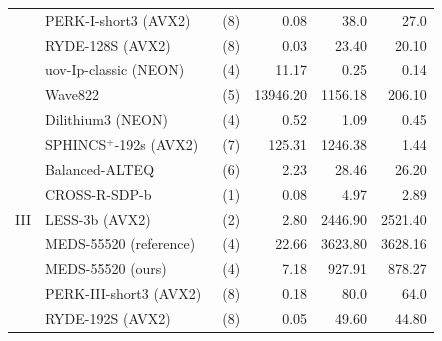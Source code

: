 \documentclass[11pt,a4paper]{report}
\theoremstyle{definition}
\begin{document}
\begin{table}
{\begin{tabular}{p{1.1cm}lrrrr}
                          & PERK-I-short3 (AVX2)~\cite{aaraj2023perk}          & (8)          & 0.08            & 38.0          & 27.0            \\
                          & RYDE-128S (AVX2)~\cite{aragon2023ryde}             & (8)          & 0.03            & 23.40         & 20.10           \\
                          & uov-Ip-classic (NEON)~\cite{beullens2023uov}       & (4)          & 11.17           & 0.25          & 0.14            \\
                          & Wave822~\cite{banegas2023wave}                     & (5)          & 13946.20        & 1156.18       & 206.10          \\
      \midrule
      \multirow{11}{*}{III}
                          & Dilithium3 (NEON)~\cite{becker2021neon}            & (4)          & 0.52            & 1.09          & 0.45            \\
                          & SPHINCS$^+$-192s (AVX2)~\cite{aumasson2022sphincs} & (7)          & 125.31          & 1246.38       & 1.44            \\
      \addlinespace[0.2em] \cline{2-6} \addlinespace[0.2em]
                          & Balanced-ALTEQ~\cite{blaser2024alteq}              & (6)          & 2.23            & 28.46         & 26.20           \\
                          & CROSS-R-SDP-b~\cite{baldi2024cross}                & (1)          & 0.08            & 4.97          & 2.89            \\
                          & LESS-3b (AVX2)~\cite{baldi2024less}                & (2)          & 2.80            & 2446.90       & 2521.40         \\
                          & MEDS-55520 (reference)                             & (4)          & 22.66           & 3623.80       & 3628.16         \\
                          & MEDS-55520 (ours)                                  & (4)          & 7.18            & 927.91        & 878.27          \\
                          & PERK-III-short3 (AVX2)~\cite{aaraj2023perk}        & (8)          & 0.18            & 80.0          & 64.0            \\
                          & RYDE-192S (AVX2)~\cite{aragon2023ryde}             & (8)          & 0.05            & 49.60         & 44.80           \\

\end{tabular}}
\end{table}
\end{document}

